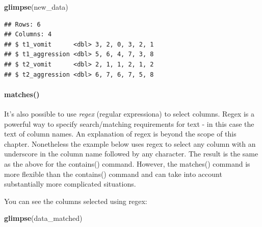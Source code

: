 \documentclass[
]{krantz}
\makeatletter
\newenvironment{Shaded}{\begin{snugshade}}{\end{snugshade}}
\newcommand{\KeywordTok}[1]{\textcolor[rgb]{0.27,0.27,0.27}{\textbf{#1}}}
\newcommand{\NormalTok}[1]{#1}
\newcommand{\OperatorTok}[1]{\textcolor[rgb]{0.43,0.43,0.43}{\textbf{#1}}}
\newcommand{\StringTok}[1]{\textcolor[rgb]{0.5,0.5,0.5}{#1}}
\newenvironment{kframe}{%
\medskip{}
\setlength{\fboxsep}{.8em}
 \def\at@end@of@kframe{}%
 \ifinner\ifhmode%
  \def\at@end@of@kframe{\end{minipage}}%
  \begin{minipage}{\columnwidth}%
 \fi\fi%
 \def\FrameCommand##1{\hskip\@totalleftmargin \hskip-\fboxsep
 \colorbox{shadecolor}{##1}\hskip-\fboxsep
     \hskip-\linewidth \hskip-\@totalleftmargin \hskip\columnwidth}%
 \MakeFramed {\advance\hsize-\width
   \@totalleftmargin\z@ \linewidth\hsize
   \@setminipage}}%
 {\par\unskip\endMakeFramed%
 \at@end@of@kframe}
\renewenvironment{Shaded}{\begin{kframe}}{\end{kframe}}
\makeatother
\begin{document}
\begin{Shaded}
\end{Shaded}

\begin{Shaded}
\begin{Highlighting}[]
\KeywordTok{glimpse}\NormalTok{(new_data)}
\end{Highlighting}
\end{Shaded}

\begin{verbatim}
## Rows: 6
## Columns: 4
## $ t1_vomit      <dbl> 3, 2, 0, 3, 2, 1
## $ t1_aggression <dbl> 5, 6, 4, 7, 3, 8
## $ t2_vomit      <dbl> 2, 1, 1, 2, 1, 2
## $ t2_aggression <dbl> 6, 7, 6, 7, 5, 8
\end{verbatim}

\hypertarget{matches}{%
\paragraph{matches()}\label{matches}}

It's also possible to use \emph{regex} (regular expressiona) to select columns. Regex is a powerful way to specify search/matching requirements for text - in this case the text of column names. An explanation of regex is beyond the scope of this chapter. Nonetheless the example below uses regex to select any column with an underscore in the column name followed by any character. The result is the same as the above for the contains() command. However, the matches() command is more flexible than the contains() command and can take into account substantially more complicated situations.

\begin{Shaded}
\end{Shaded}

You can see the columns selected using regex:

\begin{Shaded}
\begin{Highlighting}[]
\KeywordTok{glimpse}\NormalTok{(data_matched)}
\end{Highlighting}
\end{Shaded}
\end{document}
